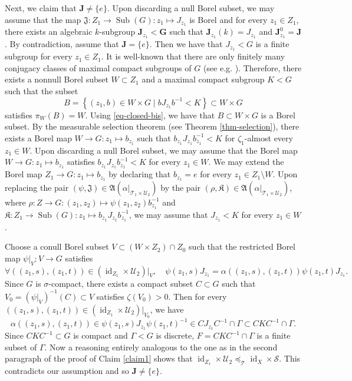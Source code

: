 \documentclass[11pt]{amsart}
\numberwithin{equation}{section}
\theoremstyle{plain}
\theoremstyle{definition}
\newcommand{\id}{\operatorname{id}}
\newcommand{\Sub}{\operatorname{Sub}}
\begin{document}
Next, we claim that $\mathbf J \neq \{e\}$. Upon discarding a null Borel subset, we may assume that the map $\mathfrak J : Z_1 \to \Sub(G) : z_1 \mapsto J_{z_1}$ is Borel and for every $z_1 \in Z_1$, there exists an algebraic $k$-subgroup $\mathbf J_{z_1} < \mathbf G$ such that $\mathbf J_{z_1}(k) = J_{z_1}$ and $\mathbf J_{z_1}^0 = \mathbf J$. By contradiction, assume that $\mathbf J = \{e\}$. Then we have that $J_{z_1} < G$ is a finite subgroup for every $z_1 \in Z_1$. It is well-known that there are only finitely many conjugacy classes of maximal compact subgroups of $G$ (see e.g.\! \cite[Corollaire 3.3.3]{BT71}). Therefore, there exists a nonnull Borel subset $W \subset Z_1$ and a maximal compact subgroup $K < G$ such that the subset 
$$B = \left\{ (z_1, b) \in W \times G \mid b J_{z_1}b^{-1} < K \right\} \subset W \times G$$
satisfies $\pi_W(B) = W$. Using \eqref{eq-closed-bis}, we have that $B \subset W \times G$ is a Borel subset. By the measurable selection theorem (see Theorem \ref{thm-selection}), there exists a Borel map $W \to G : z_{1} \mapsto b_{z_1}$ such that $b_{z_1} J_{z_1} b_{z_1}^{-1} < K$ for $\zeta_1$-almost every $z_1 \in W$. Upon discarding a null Borel subset, we may assume that the Borel map $W \to G : z_{1} \mapsto b_{z_1}$ satisfies $b_{z_1} J_{z_1} b_{z_1}^{-1} < K$ for every $z_1 \in W$. We may extend the Borel map $Z_1 \to G : z_{1} \mapsto b_{z_1}$ by declaring that $b_{z_1} = e$ for every $z_1 \in Z_1 \setminus W$. Upon replacing the pair $(\psi, \mathfrak J) \in \mathfrak A(\alpha|_{\mathscr T_1 \times \mathscr U_2})$ by the pair $(\rho, \mathfrak K) \in \mathfrak A(\alpha|_{\mathscr T_1 \times \mathscr U_2})$, where $\rho : Z \to G : (z_1, z_2) \mapsto \psi(z_1, z_2)b_{z_1}^{-1}$ and $\mathfrak K : Z_1 \to \Sub(G) : z_1 \mapsto b_{z_1} J_{z_1} b_{z_1}^{-1}$, we may assume that $J_{z_1} < K$ for every $z_1 \in W$. 

Choose a conull Borel subset $V \subset (W \times Z_2) \cap Z_0$ such that the restricted Borel map $\psi|_{V} : V \to G$ satisfies 
$$\forall ((z_1, s), (z_1, t)) \in (\id_{Z_1} \times \mathscr U_2)|_V, \quad \psi(z_1, s)J_{z_1} = \alpha((z_1, s), (z_1, t)) \psi(z_1, t) J_{z_1}.$$ 
Since $G$ is $\sigma$-compact, there exists a compact subset $C \subset G$ such that $V_0 = (\psi|_{V})^{-1}(C) \subset V$ satisfies $\zeta(V_0) > 0$.  Then for every $((z_1, s), (z_1, t)) \in (\id_{Z_1} \times \mathscr U_2)|_{V_0}$, we have 
$$\alpha((z_1, s), (z_1, t)) \in \psi(z_1, s)J_{z_1}\psi(z_1, t)^{-1}  \in C J_{z_1} C^{-1} \cap \Gamma \subset C K C^{-1} \cap \Gamma.$$ Since $C K C^{-1} \subset G$ is compact and $\Gamma < G$ is discrete, $F = C K C^{-1} \cap \Gamma$ is a finite subset of $\Gamma$. Now a reasoning entirely analogous to the one as in the second paragraph of the proof of Claim \ref{claim1} shows that $\id_{Z_1} \times \mathscr U_2 \preceq_{\mathscr T} \id_X \times \mathscr S$. This contradicts our assumption and so $\mathbf J \neq \{e\}$.
\end{document}
